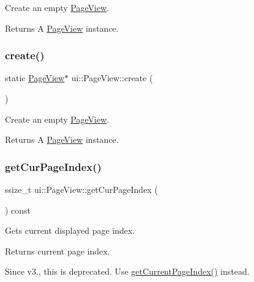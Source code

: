 Create an empty \hyperlink{classui_1_1PageView}{Page\+View}. \begin{DoxyReturn}{Returns}
A \hyperlink{classui_1_1PageView}{Page\+View} instance. 
\end{DoxyReturn}
\mbox{\label{classui_1_1PageView_ac874e906c816faf0f6e640d98345191b}} 
\subsubsection{\texorpdfstring{create()}{create()}\hspace{0.1cm}{\footnotesize\ttfamily [2/2]}}
{\footnotesize\ttfamily static \hyperlink{classui_1_1PageView}{Page\+View}$\ast$ ui\+::\+Page\+View\+::create (\begin{DoxyParamCaption}{ }\end{DoxyParamCaption})\hspace{0.3cm}{\ttfamily [static]}}

Create an empty \hyperlink{classui_1_1PageView}{Page\+View}. \begin{DoxyReturn}{Returns}
A \hyperlink{classui_1_1PageView}{Page\+View} instance. 
\end{DoxyReturn}
\mbox{\label{classui_1_1PageView_af8f0014cd5470f0734d40c945823ea17}} 
\subsubsection{\texorpdfstring{get\+Cur\+Page\+Index()}{getCurPageIndex()}\hspace{0.1cm}{\footnotesize\ttfamily [1/2]}}
{\footnotesize\ttfamily ssize\+\_\+t ui\+::\+Page\+View\+::get\+Cur\+Page\+Index (\begin{DoxyParamCaption}{ }\end{DoxyParamCaption}) const}

Gets current displayed page index. \begin{DoxyReturn}{Returns}
current page index.
\end{DoxyReturn}
Since v3., this is deprecated. Use {\ttfamily \hyperlink{classui_1_1PageView_a0e0e1e05f1804d2b633ce7fb1ac16c6d}{get\+Current\+Page\+Index()}} instead. \mbox{\label{classui_1_1PageView_a751a9452bd9a0bdb9e0cad6b69c70186}} 
